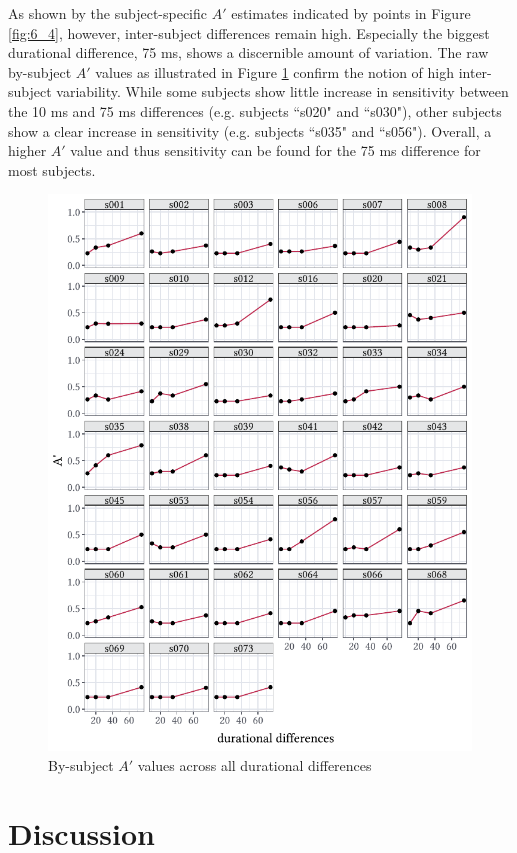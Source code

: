 As shown by the subject-specific $A'$ estimates indicated by points in Figure \ref{fig:6_4}, however, inter-subject differences remain high. Especially the biggest durational difference, 75 ms, shows a discernible amount of variation. The raw by-subject $A'$ values as illustrated in Figure \ref{fig:6_5} confirm the notion of high inter-subject variability. While some subjects show little increase in sensitivity between the 10 ms and 75 ms differences (e.g. subjects ``s020" and ``s030"), other subjects show a clear increase in sensitivity (e.g. subjects ``s035" and ``s056"). Overall, a higher $A'$ value and thus sensitivity can be found for the 75 ms difference for most subjects.

\begin{figure}
    \centering
    \includegraphics[]{figures/fig6.5.pdf}
    \caption{By-subject $A'$ values across all durational differences}
    \label{fig:6_5}
\end{figure}

\section{Discussion}\label{section06_4}

